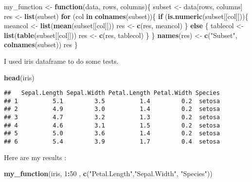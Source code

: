 \documentclass[
]{article}
\newenvironment{Shaded}{\begin{snugshade}}{\end{snugshade}}
\newcommand{\ControlFlowTok}[1]{\textcolor[rgb]{0.13,0.29,0.53}{\textbf{#1}}}
\newcommand{\DecValTok}[1]{\textcolor[rgb]{0.00,0.00,0.81}{#1}}
\newcommand{\KeywordTok}[1]{\textcolor[rgb]{0.13,0.29,0.53}{\textbf{#1}}}
\newcommand{\NormalTok}[1]{#1}
\newcommand{\OperatorTok}[1]{\textcolor[rgb]{0.81,0.36,0.00}{\textbf{#1}}}
\newcommand{\StringTok}[1]{\textcolor[rgb]{0.31,0.60,0.02}{#1}}
\begin{document}
\begin{Shaded}
\begin{Highlighting}[]
\NormalTok{my_function <-}\StringTok{ }\ControlFlowTok{function}\NormalTok{(data, rows, columns)\{}
\NormalTok{  subset <-}\StringTok{ }\NormalTok{data[rows, columns]}
\NormalTok{  res <-}\StringTok{ }\KeywordTok{list}\NormalTok{(subset)}
  \ControlFlowTok{for}\NormalTok{ (col }\ControlFlowTok{in} \KeywordTok{colnames}\NormalTok{(subset))\{}
    \ControlFlowTok{if}\NormalTok{ (}\KeywordTok{is.numeric}\NormalTok{(subset[[col]]))\{}
\NormalTok{      meancol <-}\StringTok{ }\KeywordTok{list}\NormalTok{(}\KeywordTok{mean}\NormalTok{(subset[[col]]))}
\NormalTok{      res <-}\StringTok{ }\KeywordTok{c}\NormalTok{(res, meancol)}
\NormalTok{    \} }\ControlFlowTok{else}\NormalTok{ \{}
\NormalTok{      tablecol <-}\StringTok{ }\KeywordTok{list}\NormalTok{(}\KeywordTok{table}\NormalTok{(subset[[col]]))}
\NormalTok{      res <-}\StringTok{ }\KeywordTok{c}\NormalTok{(res, tablecol)}
\NormalTok{    \}}
\NormalTok{  \}}
  \KeywordTok{names}\NormalTok{(res) <-}\StringTok{ }\KeywordTok{c}\NormalTok{(}\StringTok{"Subset"}\NormalTok{, }\KeywordTok{colnames}\NormalTok{(subset))}
\NormalTok{  res}
\NormalTok{\}}
\end{Highlighting}
\end{Shaded}

I used iris dataframe to do some tests.

\begin{Shaded}
\begin{Highlighting}[]
\KeywordTok{head}\NormalTok{(iris)}
\end{Highlighting}
\end{Shaded}

\begin{verbatim}
##   Sepal.Length Sepal.Width Petal.Length Petal.Width Species
## 1          5.1         3.5          1.4         0.2  setosa
## 2          4.9         3.0          1.4         0.2  setosa
## 3          4.7         3.2          1.3         0.2  setosa
## 4          4.6         3.1          1.5         0.2  setosa
## 5          5.0         3.6          1.4         0.2  setosa
## 6          5.4         3.9          1.7         0.4  setosa
\end{verbatim}

Here are my results :

\begin{Shaded}
\begin{Highlighting}[]
\KeywordTok{my_function}\NormalTok{(iris, }\DecValTok{1}\OperatorTok{:}\DecValTok{50}\NormalTok{ , }\KeywordTok{c}\NormalTok{(}\StringTok{"Petal.Length"}\NormalTok{,}\StringTok{"Sepal.Width"}\NormalTok{, }\StringTok{"Species"}\NormalTok{))}
\end{Highlighting}
\end{Shaded}
\end{document}
